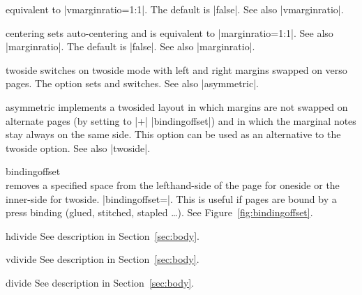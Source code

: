 \begin{Options}
  equivalent to |vmarginratio=1:1|. The default is |false|.
  See also |vmarginratio|.
\item[centering] sets auto-centering and is equivalent to
  |marginratio=1:1|. See also |marginratio|. The default is |false|.
  See also |marginratio|.
\item[twoside] switches on twoside mode with left and right margins swapped
  on verso pages. The option sets  and  
  switches. See also |asymmetric|.
\item[asymmetric] implements a twosided layout in which margins are
  not swapped on alternate pages (by setting  to 
   |+| |bindingoffset|) and in which the marginal notes
  stay always on the same side. This option can be used as an alternative
  to the twoside option. See also |twoside|.
\item[bindingoffset]~\\ removes a specified space 
  from the lefthand-side of the page for oneside or the inner-side for
  twoside. |bindingoffset=|. This is useful if pages 
  are bound by a press binding (glued, stitched, stapled \ldots).
  See Figure~\ref{fig:bindingoffset}.
\item[hdivide] See description in Section~\ref{sec:body}.
\item[vdivide] See description in Section~\ref{sec:body}.
\item[divide] See description in Section~\ref{sec:body}.
\end{Options}
